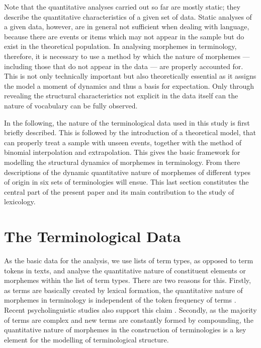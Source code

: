 Note that the quantitative analyses carried out so far are mostly static; 
they describe the quantitative characteristics of a given set of data. Static 
analyses of a given data, however, are in general not sufficient when 
dealing with language, because there are events or items which may 
not appear in the sample but do exist in the theoretical population. In 
analysing morphemes in terminology, therefore, it is necessary to use 
a method by which the nature of morphemes --- including those that do not 
appear in the data --- are properly accounted for. This is not only
technically important but also theoretically essential as it assigns 
the model a moment of dynamics and thus a basis for expectation.
Only through revealing the structural characteristics not explicit
in the data itself can the nature of vocabulary can be fully observed.

In the following, the nature of the terminological data used in this study
is first briefly described. This is followed by the introduction of a
theoretical model, that can properly treat a sample with unseen events,
together with the method of binomial interpolation and extrapolation. This gives
the basic framework for modelling the structural dynamics of morphemes
in terminology. From there descriptions of the dynamic quantitative nature of 
morphemes of different types of origin in six sets of terminologies will
ensue. This last section constitutes the central part of the present paper 
and its main contribution to the study of lexicology.


\section{The Terminological Data}

As the basic data for the analysis, we use lists of term types, as opposed
to term tokens in texts, and analyse the quantitative nature of constituent
elements or morphemes within the list of term types. There are two
reasons for this. Firstly, as terms are basically created by lexical
formation, the quantitative nature of morphemes in terminology is
independent of the token frequency of terms \cite{sager90,kage02}.
Recent psycholinguistic studies also support this claim \cite{baayen97,schreuder97}.
Secondly, as the majority of terms are complex \cite{nomura89} and
new terms are constantly formed by compounding, the quantitative nature
of morphemes in the construction of terminologies is a key element
for the modelling of terminological structure.

